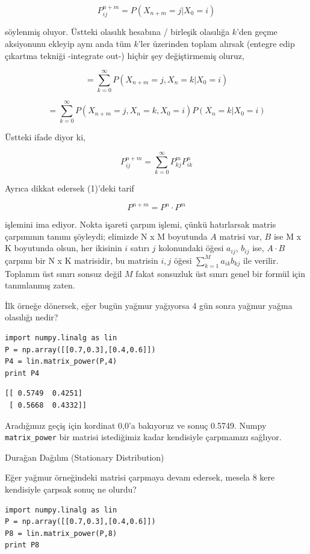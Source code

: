 \documentclass[12pt,fleqn]{article}\usepackage{../../common}
\begin{document}
$$
P_{ij}^{n+m} = P(X_{n+m} = j | X_0 = i )
$$

söylenmiş oluyor. Üstteki olasılık hesabına / birleşik olasılığa $k$'den geçme
aksiyonunu ekleyip aynı anda tüm $k$'ler üzerinden toplam alırsak (entegre edip
çıkartma tekniği -integrate out-) hiçbir şey değiştirmemiş oluruz,

$$
= \sum_{k=0}^{\infty} P(X_{n+m} = j, X_n = k | X_0 = i )
$$

$$
= \sum_{k=0}^{\infty} P(X_{n+m} = j, X_n = k, X_0 = i )
P(X_n=k|X_0=i)
$$

Üstteki ifade diyor ki,

$$
P_{ij}^{n+m} = \sum_{k=0}^{\infty} P_{kj}^m P_{ik}^n 
$$

Ayrıca dikkat edersek (1)'deki tarif

$$
P^{n+m} = P^n \cdot P^m
$$

işlemini ima ediyor. Nokta işareti çarpım işlemi, çünkü hatırlarsak matris
çarpımının tanımı şöyleydi; elimizde N x M boyutunda $A$ matrisi var, $B$ ise M
x K boyutunda olsun, her ikisinin $i$ satırı $j$ kolonundaki öğesi $a_{ij}$,
$b_{ij}$ ise, $A \cdot B$ çarpımı bir N x K matrisidir, bu matrisin $i,j$ öğesi
$\sum_{k=1}^{M} a_{ik}b_{kj}$ ile verilir. Toplamın üst sınırı sonsuz değil
$M$ fakat sonsuzluk üst sınırı genel bir formül için tanımlanmış zaten.


İlk örneğe dönersek, eğer bugün yağmur yağıyorsa 4 gün sonra yağmur yağma
olasılığı nedir?

\begin{verbatim}
import numpy.linalg as lin
P = np.array([[0.7,0.3],[0.4,0.6]])
P4 = lin.matrix_power(P,4)
print P4
\end{verbatim}

\begin{verbatim}
[[ 0.5749  0.4251]
 [ 0.5668  0.4332]]
\end{verbatim}

Aradığımız geçiş için kordinat 0,0'a bakıyoruz ve sonuç 0.5749. Numpy
\verb!matrix_power! bir matrisi istediğimiz kadar kendisiyle çarpmamızı
sağlıyor. 

Durağan Dağılım (Stationary Distribution)

Eğer yağmur örneğindeki matrisi çarpmaya devam edersek, mesela 8 kere
kendisiyle çarpsak sonuç ne olurdu? 

\begin{verbatim}
import numpy.linalg as lin
P = np.array([[0.7,0.3],[0.4,0.6]])
P8 = lin.matrix_power(P,8)
print P8
\end{verbatim}
\end{document}
